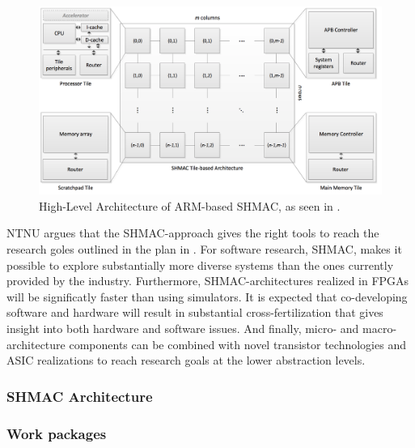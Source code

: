 \begin{figure}[htb]
    \centering
    \includegraphics[width=1.0\textwidth]{Figures/Heterogeneous/SHMAC}
    \caption{High-Level Architecture of ARM-based SHMAC, as seen in \cite{shmac-plan}.}
    \label{fig:shmac}
\end{figure}

NTNU argues that the SHMAC-approach gives the right tools to reach the research goles outlined in the plan in \cite{shmac-plan}.
For software research, SHMAC, makes it possible to explore substantially more diverse systems than the ones currently provided by the industry.
Furthermore, SHMAC-architectures realized in FPGAs will be significatly faster than using simulators.
It is expected that co-developing software and hardware will result in substantial cross-fertilization that gives insight into both hardware and software issues.
And finally, micro- and macro-architecture components can be combined with novel transistor technologies and ASIC realizations to reach research goals at the lower abstraction levels.


\subsubsection{SHMAC Architecture}

\subsubsection{Work packages}


